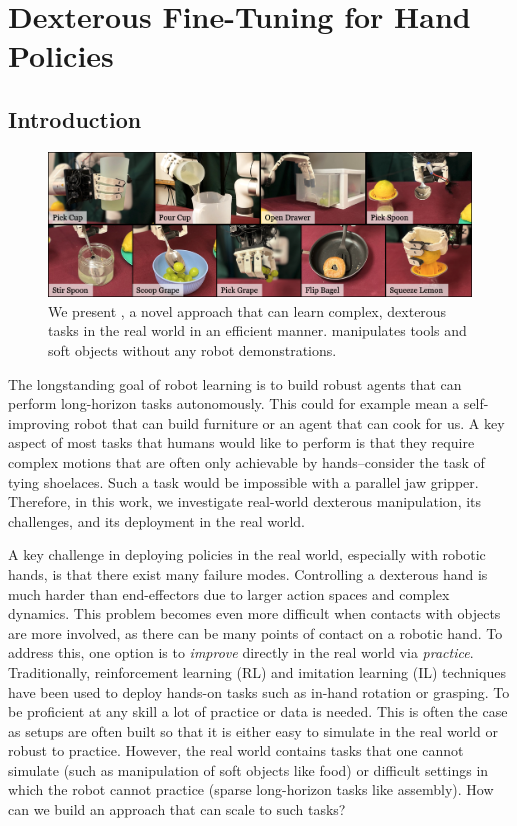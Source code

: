 \chapter{Dexterous Fine-Tuning for Hand Policies}
\label{cha:deft}

\section{Introduction}
\label{sec:intro}

\begin{figure}[H]
\centering
\includegraphics[width=\linewidth]{figs/teaser.pdf}
\vspace{-0.2in}
  \caption{\small We present \ours, a novel approach that can learn complex, dexterous tasks in the real world in an efficient manner. \ours manipulates tools and soft objects without any robot demonstrations.}
 \label{fig:teaser}
\end{figure}


The longstanding goal of robot learning is to build robust agents that can perform long-horizon tasks autonomously. This could for example mean a self-improving robot that can build furniture or an agent that can cook for us. A key aspect of most tasks that humans would like to perform is that they require complex motions that are often only achievable by hands--consider the task of tying shoelaces. Such a task would be impossible with a parallel jaw gripper. Therefore, in this work, we investigate real-world dexterous manipulation, its challenges, and its deployment in the real world. 

A key challenge in deploying  policies in the real world, especially with robotic hands, is that there exist many failure modes. Controlling a dexterous hand is much harder than end-effectors due to larger action spaces and complex dynamics. This problem becomes even more difficult when contacts with objects are more involved, as there can be many points of contact on a robotic hand. To address this, one option is to \textit{improve} directly in the real world via \textit{practice}. Traditionally, reinforcement learning (RL) and imitation learning (IL) techniques have been used to deploy hands-on tasks such as in-hand rotation or grasping. To be proficient at any skill a lot of practice or data is needed. This is often the case as setups are often built so that it is either easy to simulate in the real world or robust to practice. However, the real world contains tasks that one cannot simulate (such as manipulation of soft objects like food) or difficult settings in which the robot cannot practice (sparse long-horizon tasks like assembly). How can we build an approach that can scale to such tasks? 

